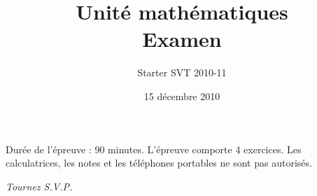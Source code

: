 




\title{Unité mathématiques \\ Examen}
\author{Starter SVT 2010-11}
\date{15 décembre 2010}



\maketitle




Durée de l'épreuve : 90 minutes. L'épreuve comporte 4 exercices. Les calculatrices, les notes et les téléphones portables ne sont pas autorisés.

\vspace{1cm}





\vspace{.5cm}





\begin{flushright}
\large{\emph{Tournez S.V.P.}}
\end{flushright}



\vspace{.5cm}



